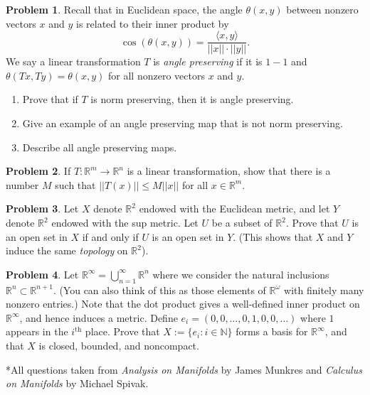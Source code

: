 \documentclass{amsart}
\newcommand{\+}[1]{\ensuremath{\mathbf{#1}}}
\newcommand{\R}{{\mathbb R}}
\theoremstyle{definition}
\newtheorem{prob}{Problem}
\begin{document}
\begin{prob}
Recall that in Euclidean space, the angle $\theta(x,y)$ between nonzero vectors $x$ and $y$ is related to their inner product by
\[
\cos(\theta(x,y)) = \frac{\langle x, y \rangle}{||x|| \cdot ||y||}.
\]
We say a linear transformation $T$ is \emph{angle preserving} if it is $1-1$ and $\theta(Tx,Ty) = \theta(x,y)$
for all nonzero vectors $x$ and $y$.
\begin{enumerate}
 \item Prove that if $T$ is norm preserving, then it is angle preserving.
 \item Give an example of an angle preserving map that is not norm preserving.
 \item Describe all angle preserving maps.
\end{enumerate}
\end{prob}

\begin{prob}
If $T: \R^m \to \R^n$ is a linear transformation, show that there is a
number $M$ such that $|| T(x) || \leq M || x ||$ for all $x \in \R^m$.
\end{prob}


\begin{prob}
 Let $X$ denote $\R^2$ endowed with the Euclidean metric, and let $Y$ denote $\R^2$ endowed with the sup metric.
 Let $U$ be a subset of $\R^2$.  Prove that $U$ is an open set in $X$ if and only if $U$ is an open set in $Y$.
 (This shows that $X$ and $Y$ induce the same \emph{topology} on $\R^2$).
\end{prob}

\begin{prob}
 Let $\R^{\infty} = \bigcup^{\infty}_{n=1} \R^n$ where we consider the natural inclusions $\R^n \subset \R^{n+1}$.  
 (You can also think of this as those elements of $\R^\omega$ with finitely many nonzero entries.)
 Note that the dot product gives a well-defined inner product on  $\R^{\infty}$, and hence induces a metric.
 Define $e_i = (0, 0, \ldots, 0, 1, 0, 0, \ldots )$ where $1$ appears in the $i^\text{th}$ place.
 Prove that $X := \{e_i: i \in \mathbb{N}\}$ forms a basis for $\R^{\infty}$, and that $X$ is
 closed, bounded, and noncompact. 
\end{prob}





\vspace{5mm}

*All questions taken from \emph{Analysis on Manifolds} by James Munkres and \emph{Calculus on Manifolds} by Michael Spivak.
\end{document}
